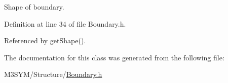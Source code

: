 Shape of boundary. 



Definition at line 34 of file Boundary.\+h.



Referenced by get\+Shape().



The documentation for this class was generated from the following file\+:\begin{DoxyCompactItemize}
\item 
M3\+S\+Y\+M/\+Structure/\hyperlink{Boundary_8h}{Boundary.\+h}\end{DoxyCompactItemize}
